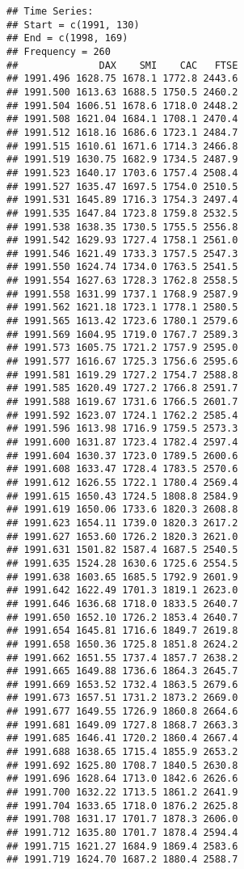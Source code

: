 \documentclass[
]{article}
\begin{document}
\begin{verbatim}
## Time Series:
## Start = c(1991, 130) 
## End = c(1998, 169) 
## Frequency = 260 
##              DAX    SMI    CAC   FTSE
## 1991.496 1628.75 1678.1 1772.8 2443.6
## 1991.500 1613.63 1688.5 1750.5 2460.2
## 1991.504 1606.51 1678.6 1718.0 2448.2
## 1991.508 1621.04 1684.1 1708.1 2470.4
## 1991.512 1618.16 1686.6 1723.1 2484.7
## 1991.515 1610.61 1671.6 1714.3 2466.8
## 1991.519 1630.75 1682.9 1734.5 2487.9
## 1991.523 1640.17 1703.6 1757.4 2508.4
## 1991.527 1635.47 1697.5 1754.0 2510.5
## 1991.531 1645.89 1716.3 1754.3 2497.4
## 1991.535 1647.84 1723.8 1759.8 2532.5
## 1991.538 1638.35 1730.5 1755.5 2556.8
## 1991.542 1629.93 1727.4 1758.1 2561.0
## 1991.546 1621.49 1733.3 1757.5 2547.3
## 1991.550 1624.74 1734.0 1763.5 2541.5
## 1991.554 1627.63 1728.3 1762.8 2558.5
## 1991.558 1631.99 1737.1 1768.9 2587.9
## 1991.562 1621.18 1723.1 1778.1 2580.5
## 1991.565 1613.42 1723.6 1780.1 2579.6
## 1991.569 1604.95 1719.0 1767.7 2589.3
## 1991.573 1605.75 1721.2 1757.9 2595.0
## 1991.577 1616.67 1725.3 1756.6 2595.6
## 1991.581 1619.29 1727.2 1754.7 2588.8
## 1991.585 1620.49 1727.2 1766.8 2591.7
## 1991.588 1619.67 1731.6 1766.5 2601.7
## 1991.592 1623.07 1724.1 1762.2 2585.4
## 1991.596 1613.98 1716.9 1759.5 2573.3
## 1991.600 1631.87 1723.4 1782.4 2597.4
## 1991.604 1630.37 1723.0 1789.5 2600.6
## 1991.608 1633.47 1728.4 1783.5 2570.6
## 1991.612 1626.55 1722.1 1780.4 2569.4
## 1991.615 1650.43 1724.5 1808.8 2584.9
## 1991.619 1650.06 1733.6 1820.3 2608.8
## 1991.623 1654.11 1739.0 1820.3 2617.2
## 1991.627 1653.60 1726.2 1820.3 2621.0
## 1991.631 1501.82 1587.4 1687.5 2540.5
## 1991.635 1524.28 1630.6 1725.6 2554.5
## 1991.638 1603.65 1685.5 1792.9 2601.9
## 1991.642 1622.49 1701.3 1819.1 2623.0
## 1991.646 1636.68 1718.0 1833.5 2640.7
## 1991.650 1652.10 1726.2 1853.4 2640.7
## 1991.654 1645.81 1716.6 1849.7 2619.8
## 1991.658 1650.36 1725.8 1851.8 2624.2
## 1991.662 1651.55 1737.4 1857.7 2638.2
## 1991.665 1649.88 1736.6 1864.3 2645.7
## 1991.669 1653.52 1732.4 1863.5 2679.6
## 1991.673 1657.51 1731.2 1873.2 2669.0
## 1991.677 1649.55 1726.9 1860.8 2664.6
## 1991.681 1649.09 1727.8 1868.7 2663.3
## 1991.685 1646.41 1720.2 1860.4 2667.4
## 1991.688 1638.65 1715.4 1855.9 2653.2
## 1991.692 1625.80 1708.7 1840.5 2630.8
## 1991.696 1628.64 1713.0 1842.6 2626.6
## 1991.700 1632.22 1713.5 1861.2 2641.9
## 1991.704 1633.65 1718.0 1876.2 2625.8
## 1991.708 1631.17 1701.7 1878.3 2606.0
## 1991.712 1635.80 1701.7 1878.4 2594.4
## 1991.715 1621.27 1684.9 1869.4 2583.6
## 1991.719 1624.70 1687.2 1880.4 2588.7

\end{verbatim}
\end{document}
